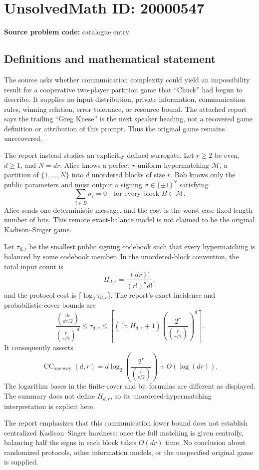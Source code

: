 \documentclass[11pt]{article}
\begin{document}
\section*{UnsolvedMath ID: 20000547}
\textbf{Source problem code:} catalogue entry
\subsection{Definitions and mathematical statement}
The source asks whether communication complexity could yield an impossibility result for a cooperative two-player partition game that ``Chuck'' had begun to describe. It supplies no input distribution, private information, communication rules, winning relation, error tolerance, or resource bound. The attached report says the trailing ``Greg Knese'' is the next speaker heading, not a recovered game definition or attribution of this prompt. Thus the original game remains unrecovered.

The report instead studies an explicitly defined surrogate. Let \(r\geq2\) be even, \(d\geq1\), and \(N=dr\). Alice knows a perfect \(r\)-uniform hypermatching \(\mathcal M\), a partition of \(\{1,\ldots,N\}\) into \(d\) unordered blocks of size \(r\). Bob knows only the public parameters and must output a signing \(\sigma\in\{\pm1\}^N\) satisfying
\[
\sum_{i\in B}\sigma_i=0\quad\text{for every block }B\in\mathcal M.
\]
Alice sends one deterministic message, and the cost is the worst-case fixed-length number of bits. This remote exact-balance model is not claimed to be the original Kadison--Singer game.

Let \(\tau_{d,r}\) be the smallest public signing codebook such that every hypermatching is balanced by some codebook member. In the unordered-block convention, the total input count is
\[
H_{d,r}=\frac{(dr)!}{(r!)^d d!},
\]
and the protocol cost is \(\lceil\log_2\tau_{d,r}\rceil\). The report's exact incidence and probabilistic-cover bounds are
\[
\frac{\binom{dr}{dr/2}}{\binom r{r/2}^{\,d}}
\leq\tau_{d,r}
\leq\left\lceil(\ln H_{d,r}+1)
\left(\frac{2^r}{\binom r{r/2}}\right)^d\right\rceil.
\]
It consequently asserts
\[
\operatorname{CC}_{\mathrm{one\mbox{-}way}}(d,r)
=d\log_2\left(\frac{2^r}{\binom r{r/2}}\right)+O(\log(dr)).
\]
The logarithm bases in the finite-cover and bit formulas are different as displayed. The summary does not define \(H_{d,r}\), so its unordered-hypermatching interpretation is explicit here.

The report emphasizes that this communication lower bound does not establish centralized Kadison--Singer hardness: once the full matching is given centrally, balancing half the signs in each block takes \(O(dr)\) time. No conclusion about randomized protocols, other information models, or the unspecified original game is supplied.
\end{document}
